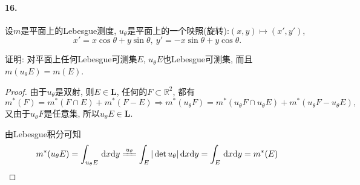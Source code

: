 \documentclass[12pt, a4paper, oneside]{ctexart}
\def\bd{\boldsymbol}    %
\def\R{\mathbb{R}}      %
\def\d{\mathrm{d}}      %
\def\L{\bd{L}}          %
\begin{document}
\paragraph{16.}设$m$是平面上的Lebesgue测度, $u_{\theta}$是平面上的一个映照(旋转):$(x, y)\mapsto (x', y')$,
\begin{equation*}
    x' = x\cos \theta+y\sin\theta,\ y'=-x\sin\theta+y\cos\theta.
\end{equation*}

证明: 对平面上任何Lebesgue可测集$E$, $u_{\theta}E$也Lebesgue可测集, 而且$m(u_{\theta}E) = m(E)$.
\begin{proof}
    由于$u_{\theta}$是双射, 则$E\in\L$, 任何的$F\subset \R^2$, 都有
    \begin{equation*}
        m^*(F) = m^*(F\cap E)+m^*(F-E)\Rightarrow 
        m^*(u_{\theta}F) = m^*(u_{\theta}F\cap u_{\theta}E)+m^*(u_{\theta}F-u_{\theta}E),
    \end{equation*}
    又由于$u_{\theta}F$是任意集, 所以$u_{\theta}E\in\L$.
    
    由Lebesgue积分可知
    \begin{equation*}
        m^*(u_{\theta}E) = \int_{u_{\theta}E}\,\d x\d y\xlongequal{u_{\theta}}\int_{E}|\det u_{\theta}|\,\d x\d y = \int_{E}\,\d x\d y = m^*(E)
    \end{equation*}
\end{proof}

\iffalse
\centerline{
    \texttt{[image: figure.png]}
}
\renewcommand\arraystretch{0.8} %
\begin{table}[!htbp] %
    \centering %
    \begin{tabular}{p{1cm}<{\centering}p{1cm}<{\centering}p{3cm}<{\centering}p{5cm}<{\centering}} %
        \toprule
        $x_i$ & $f[x_1]$ & $f[x_i,x_{i+1}]$ & $f[x_i,x_{i+1},x_{i+2}]$ \\
        \midrule
        $x_0$ & $f(x_0)$ &                  &                          \\
        $x_0$ & $f(x_0)$ & $f'(x_0)$        &                          \\
        $x_0$ & $f(x_1)$ & $\frac{f(x_1)-f(x_0)}{x_1-x_0}$ & $\frac{f(x_1)-f(x_0)}{(x_1-x_0)^2}-\frac{f'(x_0)}{x_1-x_0}$\\
        \bottomrule
    \end{tabular}
\end{table}

\def\Log{\text{Log}} %
$\Log$ %
\fi
\end{document}
